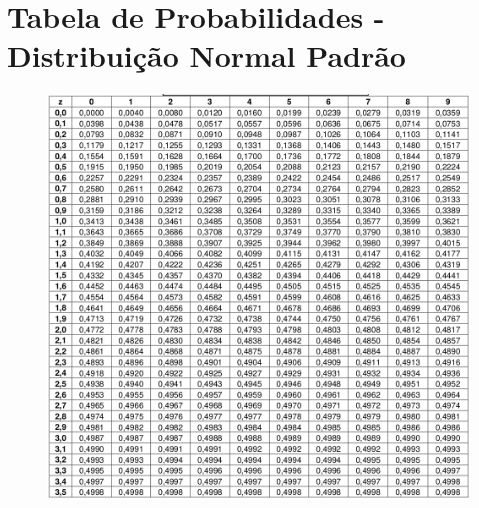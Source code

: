 \chapter{Tabela de Probabilidades - Distribuição Normal Padrão}

\begin{figure}[h]
	\center
	\label{fig:tab-prob-normal-padrao}
	\includegraphics[scale=2]{apendices/prob-normal-padrao.png}
\end{figure}